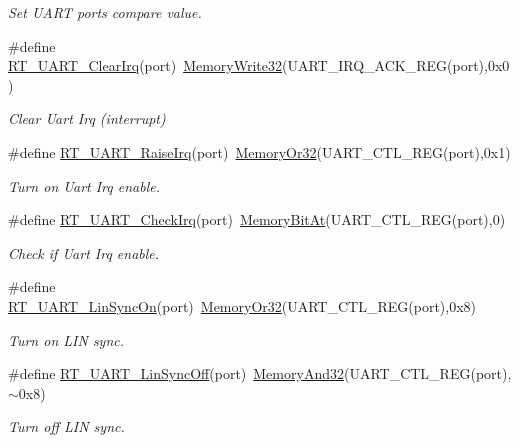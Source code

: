 \begin{DoxyCompactItemize}
\begin{DoxyCompactList}\small\item\em Set U\+A\+RT port\textquotesingle{}s compare value. \end{DoxyCompactList}\item 
\#define \mbox{\hyperlink{a00056_a84e87fc64f3149f1d5171ddca5719220}{R\+T\+\_\+\+U\+A\+R\+T\+\_\+\+Clear\+Irq}}(port)~\mbox{\hyperlink{a00020_a6b9732365b12e48ddb89fe1028b975b0}{Memory\+Write32}}(U\+A\+R\+T\+\_\+\+I\+R\+Q\+\_\+\+A\+C\+K\+\_\+\+R\+EG(port),0x0)
\begin{DoxyCompactList}\small\item\em Clear Uart Irq (interrupt) \end{DoxyCompactList}\item 
\#define \mbox{\hyperlink{a00056_ad8934a303c429b70176995f2dd6ac67b}{R\+T\+\_\+\+U\+A\+R\+T\+\_\+\+Raise\+Irq}}(port)~\mbox{\hyperlink{a00020_a27874a97deab7cecdde5ddecf466e31e}{Memory\+Or32}}(U\+A\+R\+T\+\_\+\+C\+T\+L\+\_\+\+R\+EG(port),0x1)
\begin{DoxyCompactList}\small\item\em Turn on Uart Irq enable. \end{DoxyCompactList}\item 
\#define \mbox{\hyperlink{a00056_a3e29e879f76b82a13419f4d59a1c3053}{R\+T\+\_\+\+U\+A\+R\+T\+\_\+\+Check\+Irq}}(port)~\mbox{\hyperlink{a00020_afc530c7e6b49b0ca97c1ad9dac1c4750}{Memory\+Bit\+At}}(U\+A\+R\+T\+\_\+\+C\+T\+L\+\_\+\+R\+EG(port),0)
\begin{DoxyCompactList}\small\item\em Check if Uart Irq enable. \end{DoxyCompactList}\item 
\#define \mbox{\hyperlink{a00056_a49f9d43f5fd87ceed952123010e015fa}{R\+T\+\_\+\+U\+A\+R\+T\+\_\+\+Lin\+Sync\+On}}(port)~\mbox{\hyperlink{a00020_a27874a97deab7cecdde5ddecf466e31e}{Memory\+Or32}}(U\+A\+R\+T\+\_\+\+C\+T\+L\+\_\+\+R\+EG(port),0x8)
\begin{DoxyCompactList}\small\item\em Turn on L\+IN sync. \end{DoxyCompactList}\item 
\#define \mbox{\hyperlink{a00056_aea01869278bc3c4e332af854c4e660be}{R\+T\+\_\+\+U\+A\+R\+T\+\_\+\+Lin\+Sync\+Off}}(port)~\mbox{\hyperlink{a00020_ad87cedffcaadc51db22594fce55173d4}{Memory\+And32}}(U\+A\+R\+T\+\_\+\+C\+T\+L\+\_\+\+R\+EG(port),$\sim$0x8)
\begin{DoxyCompactList}\small\item\em Turn off L\+IN sync. \end{DoxyCompactList}\item 

\end{DoxyCompactItemize}
